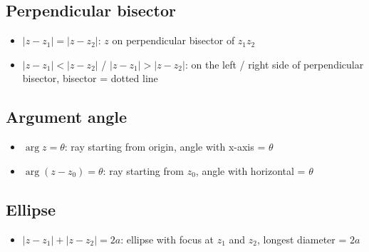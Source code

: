 \subsection{Perpendicular bisector}
\begin{itemize}
	\item $|z-z_1|=|z-z_2|$: $z$ on perpendicular bisector of $z_1z_2$
	\item $|z-z_1|<|z-z_2|$ / $|z-z_1|>|z-z_2|$: on the left / right side of perpendicular bisector, bisector = dotted line
\end{itemize}
\subsection{Argument angle}
\begin{itemize}
	\item $\arg z = \theta$: ray starting from origin, angle with x-axis = $\theta$
	\item $\arg (z-z_0) = \theta$: ray starting from $z_0$, angle with horizontal = $\theta$
\end{itemize}
\subsection{Ellipse}
\begin{itemize}
	\item $|z-z_1|+|z-z_2|=2a$: ellipse with focus at $z_1$ and $z_2$, longest diameter = $2a$
\end{itemize}

